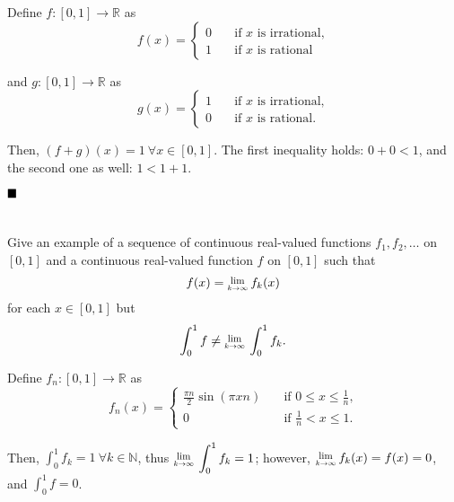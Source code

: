 \documentclass[11pt, a4paper, tikz]{article}
\newcommand{\centsection}[1]{
	\section*{\centering{#1}}
}
\renewcommand{\qed}{\hfill\blacksquare}
\newcommand{\Lim}[1]{\raisebox{0.5ex}{\scalebox{0.8}{$\displaystyle \lim_{#1}\;$}}}
\newcommand{\Int}[2]{\displaystyle \int_{#1}^{#2}}
\newcommand{\naturals}{
	\ensuremath{\mathbb{N}}
}
\newcommand{\reals}{
	\ensuremath{\mathbb{R}}
}
\begin{document}
	Define $f:[0,1]\rightarrow\reals$ as
	\[
		f(x) =
		\begin{cases}
			0 &\quad \textrm{if $x$ is irrational,}\\
			1 &\quad \textrm{if $x$ is rational}
		\end{cases}
	\]
	
	and $g:[0,1]\rightarrow\reals$ as
	\[
		g(x) =
		\begin{cases}
			1 &\quad \textrm{if $x$ is irrational,}\\
			0 &\quad \textrm{if $x$ is rational.}
		\end{cases}
	\]
	
	Then, $(f+g)(x) = 1\ \forall x\in[0,1]$. The first inequality holds: $0 + 0 < 1$, and the second one as well: $1 < 1 + 1$.
	
	$\qed$
	
	\centsection{Exercise 5}
	
	\begin{formulationBox}
		Give an example of a sequence of continuous real-valued functions $f_1, f_2, \dots$ on $[0,1]$ and a continuous real-valued function $f$ on $[0,1]$ such that \[f(x)=\Lim{k\rightarrow\infty}f_k(x)\] for each $x\in[0,1]$ but \[\Int{0}{1}f \neq \Lim{k\rightarrow\infty}\Int{0}{1}f_k.\]
	\end{formulationBox}
	
	Define $f_n:[0,1]\rightarrow\reals$ as
	\[
		f_n(x) =
		\begin{cases}
			\frac{\pi n}{2}\sin(\pi xn) &\quad \textrm{if $0\leq x\leq \frac{1}{n}$,}\\
			0 &\quad \textrm{if $\frac{1}{n} < x \leq 1$.}
		\end{cases}
	\]
	
	Then, $\Int{0}{1}f_k = 1\ \forall k\in\naturals$, thus $\Lim{k\rightarrow\infty}\Int{0}{1}f_k = 1$; however, $\Lim{k\rightarrow\infty}f_k(x) = f(x) = 0$, and $\Int{0}{1}f = 0$.
\end{document}
